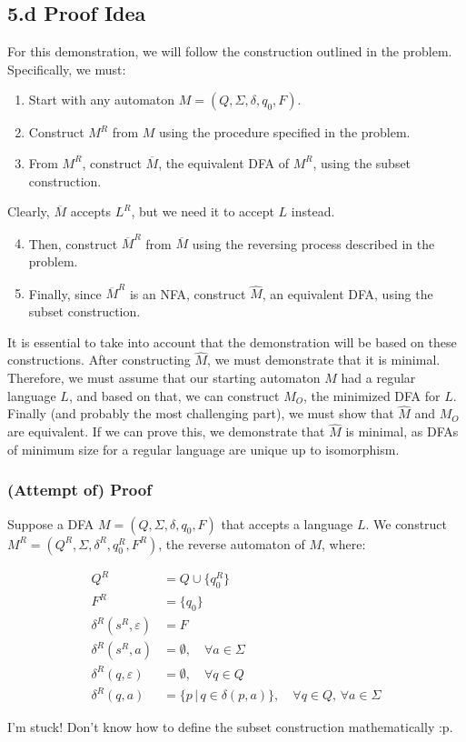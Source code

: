 \documentclass[12pt]{article}
\begin{document}
\subsection*{5.d Proof Idea}

For this demonstration, we will follow the construction outlined in the problem. Specifically, we must:

\begin{enumerate}
    \item Start with any automaton $M = (Q, \Sigma, \delta, q_0, F)$.
    \item Construct $M^R$ from $M$ using the procedure specified in the problem.
    \item From $M^R$, construct $\overline{M}$, the equivalent DFA of $M^R$, using the subset construction.
\end{enumerate}

Clearly, $\overline{M}$ accepts $L^R$, but we need it to accept $L$ instead. 

\begin{enumerate}
    \setcounter{enumi}{3}
    \item Then, construct $\overline{M}^R$ from $\overline{M}$ using the reversing process described in the problem.
    \item Finally, since $\overline{M}^R$ is an NFA, construct $\widehat{M}$, an equivalent DFA, using the subset construction.
\end{enumerate}

It is essential to take into account that the demonstration will be based on these constructions. After constructing $\widehat{M}$, we must demonstrate that it is minimal. Therefore, we must assume that our starting automaton $M$ had a regular language $L$, and based on that, we can construct $M_O$, the minimized DFA for $L$. Finally (and probably the most challenging part), we must show that $\widehat{M}$ and $M_O$ are equivalent. If we can prove this, we demonstrate that $\widehat{M}$ is minimal, as DFAs of minimum size for a regular language are unique up to isomorphism.

\subsubsection*{(Attempt of) Proof}

Suppose a DFA $M = (Q, \Sigma, \delta, q_0, F)$ that accepts a language $L$. We construct $M^R = (Q^R, \Sigma, \delta^R, q_0^R, F^R)$, the reverse automaton of $M$, where:

\begin{align*}
    Q^R &= Q \cup \{q_0^R\} \\
    F^R &= \{q_0\} \\
    \delta^R(s^R, \varepsilon) &= F \\
    \delta^R(s^R, a) &= \emptyset, \quad \forall a \in \Sigma \\
    \delta^R(q, \varepsilon) &= \emptyset, \quad \forall q \in Q \\
    \delta^R(q, a) &= \{p \,|\, q \in \delta(p, a)\}, \quad \forall q \in Q, \, \forall a \in \Sigma
\end{align*}

I’m stuck! Don’t know how to define the subset construction mathematically :p. 
\end{document}
